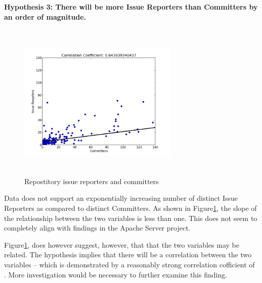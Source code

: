 \documentclass{proc}
\begin{document}
\textbf{Hypothesis 3: There will be more Issue Reporters than Committers by an order of magnitude.}\\
\begin{figure}
\includegraphics[height=3in,width=3in]{images/issue_reporters_committers_scatterplot.png}
\caption{Repostitory issue reporters and committers}
\label{fig:issue_reporters_committers_scatterplot}
\end{figure}
Data does not support an exponentially increasing number of distinct Issue Reporters as compared to distinct Committers. 
As shown in Figure\ref{fig:issue_reporters_committers_scatterplot}, the slope of the relationship between the two variables is less than one. This does not seem to completely align with findings in the Apache Server project\cite{mockus2000case}. 

Figure\ref{fig:issue_reporters_committers_scatterplot}, does however suggest, however, that that the two variables may be related. The hypothesis implies that there will be a correlation between the two variables -- which is demonstrated by a reasonably strong correlation cofficient of . More investigation would be necessary to further examine this finding.\\
\end{document}
